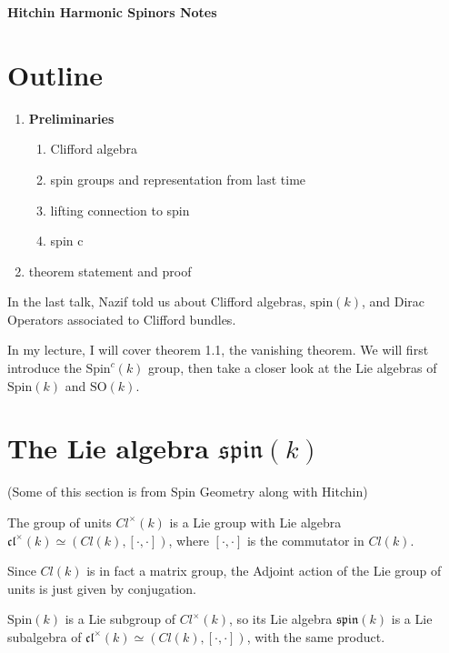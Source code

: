 \documentclass[11pt, reqno]{article}
\theoremstyle{plain}
\theoremstyle{definition}
\theoremstyle{remark}
\begin{document}
\topmargin=-40pt
\renewcommand{\headrulewidth}{1pt}
\renewcommand{\headsep}{20pt}
\thispagestyle{fancy}

{\Huge \bfseries \noindent Hitchin Harmonic Spinors Notes}

\section{Outline}
\begin{enumerate}
    \item \textbf{Preliminaries}
    \begin{enumerate}
        \item Clifford algebra
        \item spin groups and representation from last time
        \item lifting connection to spin
        \item spin c
    \end{enumerate}

    \item theorem statement and proof 
\end{enumerate}


In the last talk, Nazif told us about Clifford algebras, $\text{spin}(k)$, and Dirac Operators associated to Clifford bundles. 

In my lecture, I will cover theorem 1.1, the vanishing theorem. We will first introduce the $\text{Spin}^c(k)$ group, then take a closer look at the Lie algebras
of $\text{Spin}(k)$ and $\text{SO}(k)$. 

\section{The Lie algebra $\mathfrak{spin}(k)$}

(Some of this section is from Spin Geometry along with Hitchin)

The group of units $Cl^\times(k)$ is a Lie group with Lie algebra $\mathfrak{cl}^\times(k) \simeq (Cl(k), [\cdot,\cdot])$, where $[\cdot,\cdot]$ is the 
commutator in $Cl(k)$. 

Since $Cl(k)$ is in fact a matrix group, the Adjoint action of the Lie group of units is just given by conjugation. 

$\text{Spin}(k)$ is a Lie subgroup of $Cl^\times(k)$, so its Lie algebra $\mathfrak{spin}(k)$ is a Lie subalgebra of 
$\mathfrak{cl}^\times(k) \simeq (Cl(k), [\cdot,\cdot])$, with the same product. 
\end{document}
